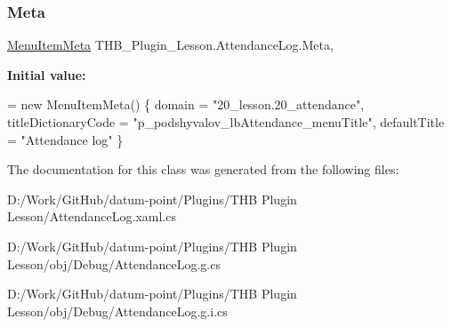 \subsubsection{\texorpdfstring{Meta}{Meta}}
{\footnotesize\ttfamily \mbox{\hyperlink{class_uniform_client_1_1_plugins_1_1_menu_item_meta}{Menu\+Item\+Meta}} T\+H\+B\+\_\+\+Plugin\+\_\+\+Lesson.\+Attendance\+Log.\+Meta\hspace{0.3cm}{\ttfamily [get]}, {\ttfamily [set]}}

{\bfseries Initial value\+:}
\begin{DoxyCode}
= \textcolor{keyword}{new} MenuItemMeta()
        \{
            domain = \textcolor{stringliteral}{"20\_lesson.20\_attendance"},
            titleDictionaryCode = \textcolor{stringliteral}{"p\_podshyvalov\_lbAttendance\_menuTitle"},
            defaultTitle = \textcolor{stringliteral}{"Attendance log"}
        \}
\end{DoxyCode}


The documentation for this class was generated from the following files\+:\begin{DoxyCompactItemize}
\item 
D\+:/\+Work/\+Git\+Hub/datum-\/point/\+Plugins/\+T\+H\+B Plugin Lesson/Attendance\+Log.\+xaml.\+cs\item 
D\+:/\+Work/\+Git\+Hub/datum-\/point/\+Plugins/\+T\+H\+B Plugin Lesson/obj/\+Debug/Attendance\+Log.\+g.\+cs\item 
D\+:/\+Work/\+Git\+Hub/datum-\/point/\+Plugins/\+T\+H\+B Plugin Lesson/obj/\+Debug/Attendance\+Log.\+g.\+i.\+cs\end{DoxyCompactItemize}
